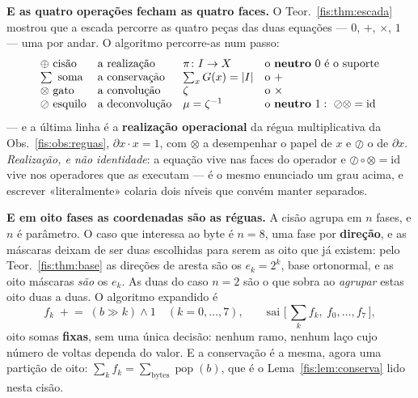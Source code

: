 \documentclass[livro.tex]{subfiles}
\begin{document}
\medskip\noindent\textbf{E as quatro operações fecham as quatro faces.} O
Teor.~\ref{fis:thm:escada} mostrou que a escada percorre as quatro peças das duas
equações --- $0$, $+$, $\times$, $1$ --- uma por andar. O algoritmo percorre-as
num passo:
\[
\begin{array}{llll}
\oplus\ \text{cisão} & \text{a realização} & \pi\colon I\to X & \text{o \textbf{neutro} }0\ \text{é o suporte}\\
\sum\ \text{soma} & \text{a conservação} & \sum_x G(x)=\lvert I\rvert & \text{o }+\\
\otimes\ \text{gato} & \text{a convolução} & \zeta & \text{o }\times\\
\oslash\ \text{esquilo} & \text{a deconvolução} & \mu=\zeta^{-1} & \text{o \textbf{neutro} }1:\ \oslash\otimes=\mathrm{id}
\end{array}
\]
--- e a última linha é a \textbf{realização operacional} da régua multiplicativa da
Obs.~\ref{fis:obs:reguas}, $\partial x\cdot x=1$, com $\otimes$ a desempenhar o papel
de $x$ e $\oslash$ o de $\partial x$. \emph{Realização, e não identidade}: a
equação vive nas faces do operador e $\oslash\circ\otimes=\mathrm{id}$ vive nos
operadores que as executam --- é o mesmo enunciado um grau acima, e escrever
«literalmente» colaria dois níveis que convém manter separados.

\medskip\noindent\textbf{E em oito fases as coordenadas são as réguas.} A cisão
agrupa em $n$ fases, e $n$ é parâmetro. O caso que interessa ao byte é $n=8$, uma
fase por \textbf{direção}, e as máscaras deixam de ser duas escolhidas para serem
as oito que já existem: pelo Teor.~\ref{fis:thm:base} as direções de aresta são os
$e_k=2^{k}$, base ortonormal, e as oito máscaras \emph{são} os $e_k$. As duas do
caso $n=2$ são o que sobra ao \emph{agrupar} estas oito duas a duas. O algoritmo
expandido é
\[
\boxed{\;
f_k \;\mathrel{+}=\; (b\gg k)\wedge 1 \quad (k=0,\dots,7),
\qquad
\text{sai } \bigl[\,\textstyle\sum_k f_k,\ f_0,\dots,f_7\,\bigr],
\;}
\]
oito somas \textbf{fixas}, sem uma única decisão: nenhum ramo, nenhum laço cujo
número de voltas dependa do valor. E a conservação é a mesma, agora uma partição
de oito: $\sum_k f_k=\sum_{\text{bytes}}\operatorname{pop}(b)$, que é o
Lema~\ref{fis:lem:conserva} lido nesta cisão.

\end{document}

